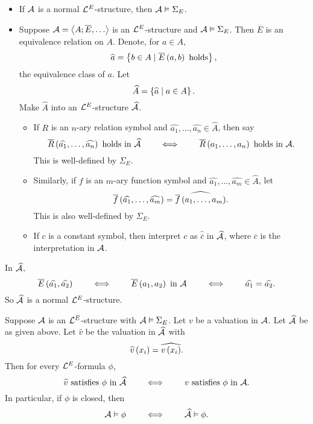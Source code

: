 \begin{remark1}
\hfill
\begin{itemize}
\item If $ \AA $ is a normal $ \LL^E $-structure, then $ \AA \vDash \Sigma_E $.
\item Suppose $ \AA = \ab{A; \overline{E}, \dots} $ is an $ \LL^E $-structure and $ \AA \vDash \Sigma_E $. Then $ \overline{E} $ is an equivalence relation on $ A $. Denote, for $ a \in A $,
$$ \widehat{a} = \cb{b \in A \mid \overline{E}\rb{a, b} \ \text{holds}}, $$
the equivalence class of $ a $. Let
$$ \widehat{A} = \cb{\widehat{a} \mid a \in A}. $$
Make $ \widehat{A} $ into an $ \LL^E $-structure $ \widehat{\AA} $.
\begin{itemize}
\item If $ R $ is an $ n $-ary relation symbol and $ \widehat{a_1}, \dots, \widehat{a_n} \in \widehat{A} $, then say
$$ \overline{R}\rb{\widehat{a_1}, \dots, \widehat{a_n}} \ \text{holds in} \ \widehat{\AA} \qquad \iff \qquad \overline{R}\rb{a_1, \dots, a_n} \ \text{holds in} \ \AA. $$
This is well-defined by $ \Sigma_E $.
\item Similarly, if $ f $ is an $ m $-ary function symbol and $ \widehat{a_1}, \dots, \widehat{a_m} \in \widehat{A} $, let
$$ \overline{f}\rb{\widehat{a_1}, \dots, \widehat{a_m}} = \widehat{\overline{f}\rb{a_1, \dots, a_m}}. $$
This is also well-defined by $ \Sigma_E $.
\item If $ c $ is a constant symbol, then interpret $ c $ as $ \widehat{\overline{c}} $ in $ \widehat{\AA} $, where $ \overline{c} $ is the interpretation in $ \AA $.
\end{itemize}
\end{itemize}
\end{remark1}

\begin{note}
In $ \widehat{\AA} $,
$$ \overline{E}\rb{\widehat{a_1}, \widehat{a_2}} \qquad \iff \qquad \overline{E}\rb{a_1, a_2} \ \text{in} \ \AA \qquad \iff \qquad \widehat{a_1} = \widehat{a_2}. $$
So $ \widehat{\AA} $ is a normal $ \LL^E $-structure.
\end{note}

\begin{lemma}
\label{lem:2.6.3}
Suppose $ \AA $ is an $ \LL^E $-structure with $ \AA \vDash \Sigma_E $. Let $ v $ be a valuation in $ \AA $. Let $ \widehat{\AA} $ be as given above. Let $ \widehat{v} $ be the valuation in $ \widehat{\AA} $ with
$$ \widehat{v}\rb{x_i} = \widehat{v\rb{x_i}}. $$
Then for every $ \LL^E $-formula $ \phi $,
$$ \widehat{v} \ \text{satisfies} \ \phi \ \text{in} \ \widehat{\AA} \qquad \iff \qquad v \ \text{satisfies} \ \phi \ \text{in} \ \AA. $$
In particular, if $ \phi $ is closed, then
$$ \AA \vDash \phi \qquad \iff \qquad \widehat{\AA} \vDash \phi. $$
\end{lemma}

